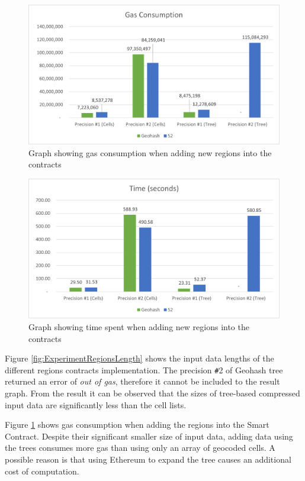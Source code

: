\begin{figure}[htb!]
  \centering
  \includegraphics[width=\textwidth]{images/ExperimentRegionsGas.png}
  \caption{Graph showing gas consumption when adding new regions into the contracts}
  \label{fig:ExperimentRegionsGas}
\end{figure}

\begin{figure}[htb!]
  \centering
  \includegraphics[width=\textwidth]{images/ExperimentRegionsTime.png}
  \caption{Graph showing time spent when adding new regions into the contracts}
  \label{fig:ExperimentRegionsTime}
\end{figure}

\npara Figure \ref{fig:ExperimentRegionsLength} shows the input data lengths of the different regions contracts implementation.
The precision \verb|#|2 of Geohash tree returned an error of \textit{out of gas}, therefore it cannot be included to the result graph.
From the result it can be observed that the sizes of tree-based compressed input data are significantly less than the cell lists.

\npara Figure \ref{fig:ExperimentRegionsGas} shows gas consumption when adding the regions into the Smart Contract.
Despite their significant smaller size of input data, adding data using the trees consumes more gas than using only an array of geocoded cells.
A possible reason is that using Ethereum to expand the tree causes an additional cost of computation.

